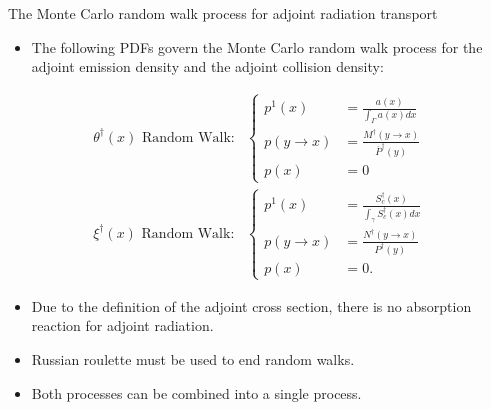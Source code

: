 \documentclass{beamer}
\begin{document}
\begin{frame}{The Monte Carlo random walk process for adjoint radiation transport}
  \begin{itemize}
    \item The following PDFs govern the Monte Carlo random walk process for
      the adjoint emission density and the adjoint collision density:
  \end{itemize}
  \begin{align}
    \theta^{\dagger}(x)\text{ Random Walk:}&
    \begin{cases}
      p^1(x) & = \frac{a(x)}{\int_{\Gamma} a(x)dx} \\
      p(y \to x) & = \frac{M^{\dagger}(y \to x)}{\overline{P}^{\dagger}(y)} \\
      p(x) & = 0
    \end{cases} \nonumber \\
    \xi^{\dagger}(x)\text{ Random Walk:}&
    \begin{cases}
      p^1(x) & = \frac{S_c^{\dagger}(x)}{\int_{\gamma} S_c^{\dagger}(x)dx} \\
      p(y \to x) & = \frac{N^{\dagger}(y \to x)}{P^{\dagger}(y)} \\
      p(x) & = 0.
    \end{cases} \nonumber
  \end{align}

  \begin{itemize}
    \item Due to the definition of the adjoint cross section, there is no
      absorption reaction for adjoint radiation.
    \item Russian roulette must be used to end random walks.
    \item Both processes can be combined into a single process.
  \end{itemize}

\end{frame}
\end{document}
